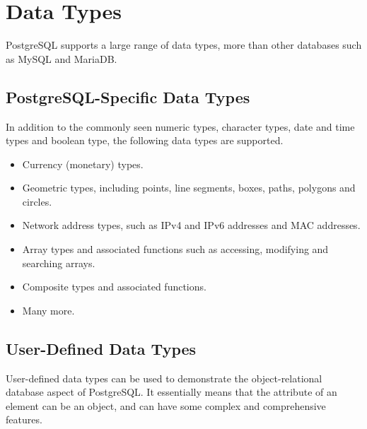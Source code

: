 \section{Data Types}

PostgreSQL supports a large range of data types, more than other databases such as MySQL and MariaDB. 

\subsection{PostgreSQL-Specific Data Types}

In addition to the commonly seen numeric types, character types, date and time types and boolean type, the following data types are supported.
\begin{itemize}
	\item Currency (monetary) types.
	\item Geometric types, including points, line segments, boxes, paths, polygons and circles.
	\item Network address types, such as IPv4 and IPv6 addresses and MAC addresses.
	\item Array types and associated functions such as accessing, modifying and searching arrays.
	\item Composite types and associated functions.
	\item Many more.
\end{itemize}

\subsection{User-Defined Data Types}

User-defined data types can be used to demonstrate the object-relational database aspect of PostgreSQL. It essentially means that the attribute of an element can be an object, and can have some complex and comprehensive features.

